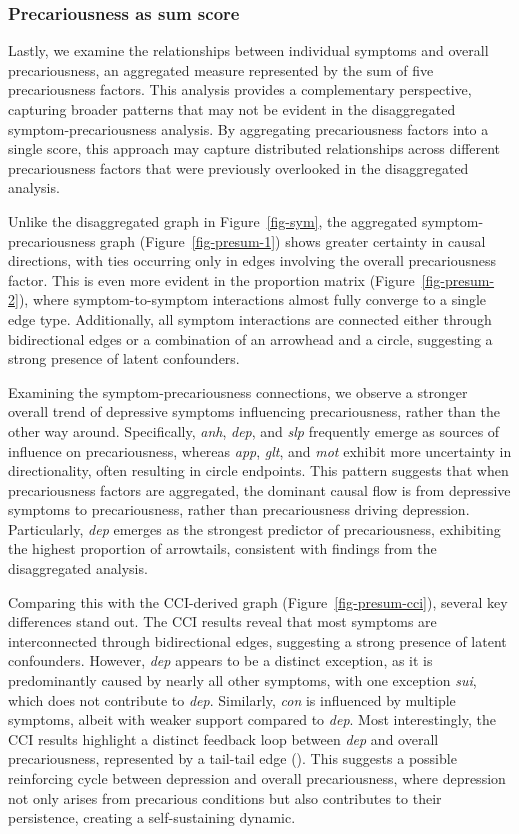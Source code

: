\documentclass[
]{article}
\begin{document}
\restoregeometry

\subsubsection{Precariousness as sum
score}\label{precariousness-as-sum-score}

Lastly, we examine the relationships between individual symptoms and
overall precariousness, an aggregated measure represented by the sum of
five precariousness factors. This analysis provides a complementary
perspective, capturing broader patterns that may not be evident in the
disaggregated symptom-precariousness analysis. By aggregating
precariousness factors into a single score, this approach may capture
distributed relationships across different precariousness factors that
were previously overlooked in the disaggregated analysis.

Unlike the disaggregated graph in Figure~\ref{fig-sym}, the aggregated
symptom-precariousness graph (Figure~\ref{fig-presum-1}) shows greater
certainty in causal directions, with ties occurring only in edges
involving the overall precariousness factor. This is even more evident
in the proportion matrix (Figure~\ref{fig-presum-2}), where
symptom-to-symptom interactions almost fully converge to a single edge
type. Additionally, all symptom interactions are connected either
through bidirectional edges or a combination of an arrowhead and a
circle, suggesting a strong presence of latent confounders.

Examining the symptom-precariousness connections, we observe a stronger
overall trend of depressive symptoms influencing precariousness, rather
than the other way around. Specifically, \emph{anh}, \emph{dep}, and
\emph{slp} frequently emerge as sources of influence on precariousness,
whereas \emph{app}, \emph{glt}, and \emph{mot} exhibit more uncertainty
in directionality, often resulting in circle endpoints. This pattern
suggests that when precariousness factors are aggregated, the dominant
causal flow is from depressive symptoms to precariousness, rather than
precariousness driving depression. Particularly, \emph{dep} emerges as
the strongest predictor of precariousness, exhibiting the highest
proportion of arrowtails, consistent with findings from the
disaggregated analysis.

Comparing this with the CCI-derived graph (Figure~\ref{fig-presum-cci}),
several key differences stand out. The CCI results reveal that most
symptoms are interconnected through bidirectional edges, suggesting a
strong presence of latent confounders. However, \emph{dep} appears to be
a distinct exception, as it is predominantly caused by nearly all other
symptoms, with one exception \emph{sui}, which does not contribute to
\emph{dep}. Similarly, \emph{con} is influenced by multiple symptoms,
albeit with weaker support compared to \emph{dep}. Most interestingly,
the CCI results highlight a distinct feedback loop between \emph{dep}
and overall precariousness, represented by a tail-tail edge
(\textemdash ). This suggests a possible reinforcing cycle between
depression and overall precariousness, where depression not only arises
from precarious conditions but also contributes to their persistence,
creating a self-sustaining dynamic.
\end{document}
